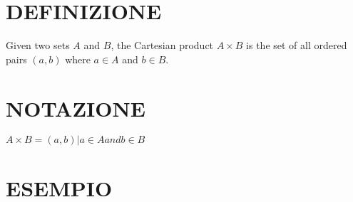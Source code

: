 
\section{DEFINIZIONE}
Given two sets $A$ and $B$, the Cartesian product $A \times B$ is the set of all ordered pairs $(a,b)$ where $a \in A$ and 
$b \in B$.

\section{NOTAZIONE}
$A \times B = {(a,b) | a \in A and b \in B }$
\section{ESEMPIO}


